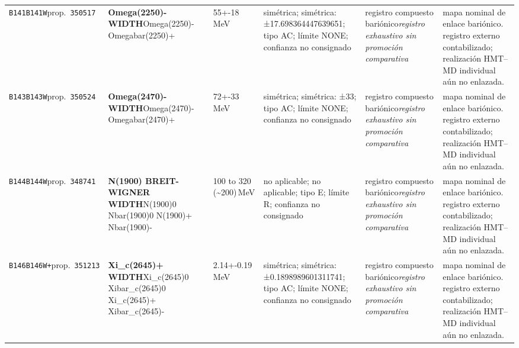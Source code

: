 \begin{landscape}
\begin{longtable}{L{1.85cm}L{4.45cm}L{2.35cm}L{4.05cm}L{3.35cm}L{7.15cm}}
\texttt{B141}\newline \texttt{B141W}\newline prop.\ \texttt{350517} & \textbf{Omega(2250)- WIDTH}\newline Omega(2250)- \textbar{}\allowbreak{} Omegabar(2250)+ & 55+-18\,MeV & simétrica; simétrica: ±17.698364447639651; tipo AC; límite NONE; confianza no consignado & registro compuesto bariónico\newline \emph{registro exhaustivo sin promoción comparativa} & mapa nominal de enlace bariónico. registro externo contabilizado; realización HMT--MD individual aún no enlazada. \\
\texttt{B143}\newline \texttt{B143W}\newline prop.\ \texttt{350524} & \textbf{Omega(2470)- WIDTH}\newline Omega(2470)- \textbar{}\allowbreak{} Omegabar(2470)+ & 72+-33\,MeV & simétrica; simétrica: ±33; tipo AC; límite NONE; confianza no consignado & registro compuesto bariónico\newline \emph{registro exhaustivo sin promoción comparativa} & mapa nominal de enlace bariónico. registro externo contabilizado; realización HMT--MD individual aún no enlazada. \\
\texttt{B144}\newline \texttt{B144W}\newline prop.\ \texttt{348741} & \textbf{N(1900) BREIT-WIGNER WIDTH}\newline N(1900)0 \textbar{}\allowbreak{} Nbar(1900)0 \textbar{}\allowbreak{} N(1900)+ \textbar{}\allowbreak{} Nbar(1900)- & 100 to 320 (\textasciitilde{}200)\,MeV & no aplicable; no aplicable; tipo E; límite R; confianza no consignado & registro compuesto bariónico\newline \emph{registro exhaustivo sin promoción comparativa} & mapa nominal de enlace bariónico. registro externo contabilizado; realización HMT--MD individual aún no enlazada. \\
\texttt{B146}\newline \texttt{B146W+}\newline prop.\ \texttt{351213} & \textbf{Xi\_\allowbreak{}c(2645)+ WIDTH}\newline Xi\_\allowbreak{}c(2645)0 \textbar{}\allowbreak{} Xibar\_\allowbreak{}c(2645)0 \textbar{}\allowbreak{} Xi\_\allowbreak{}c(2645)+ \textbar{}\allowbreak{} Xibar\_\allowbreak{}c(2645)- & 2.14+-0.19\,MeV & simétrica; simétrica: ±0.1898989601311741; tipo AC; límite NONE; confianza no consignado & registro compuesto bariónico\newline \emph{registro exhaustivo sin promoción comparativa} & mapa nominal de enlace bariónico. registro externo contabilizado; realización HMT--MD individual aún no enlazada. \\

\end{longtable}
\end{landscape}
